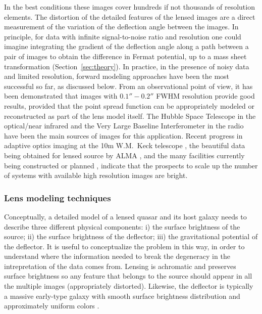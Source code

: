 In the best conditions these images cover hundreds if not thousands of
resolution elements. The distortion of the detailed features of the
lensed images are a direct measurement of the variation of the
deflection angle between the images.  In principle, for data with
infinite signal-to-noise ratio and resolution one could imagine
integrating the gradient of the deflection angle along a path between a
pair of images to obtain the difference in Fermat potential,
up to a mass sheet transformation (Section~\ref{sec:theory}).
In practice, in the presence of noisy data and limited resolution,
forward modeling approaches have been the most successful so far, as
discussed below. From an observational point of view, it has been
demonstrated that images with $0.1''-0.2''$ FWHM resolution provide
good results, provided that the point spread function can be
appropriately modeled or reconstructed as part of the lens model
itself. The Hubble Space Telescope in the optical/near infrared
\citep{Suy++10,Suy++13,Suy++14,BirrerEtal2015} and the Very Large Baseline
Interferometer in the radio \citep{WBB04} have been the main sources
of images for this application. Recent progress in adaptive optics
imaging at the 10m W.M.~Keck telescope \citep{Che++16}, the beautiful data being
obtained for lensed source by ALMA \citep{Hez++13a}, and the many
facilities currently being constructed or planned \citep{Men++15},
indicate that the prospects to scale up the number of systems with
available high resolution images are bright.


\subsubsection{Lens modeling techniques}

Conceptually, a detailed model of a lensed quasar and its host galaxy
needs to describe three different physical components: i) the surface
brightness of the source; ii) the surface brightness of the deflector;
iii) the gravitational potential of the deflector. It is useful to
conceptualize the problem in this way, in order to understand where
the information needed to break the degeneracy in the intrepretation
of the data comes from. Lensing is achromatic and preserves surface
brightness so any feature that belongs to the source \cite[including
in line of sight velocity][]{Hez++13} should appear in all the
multiple images (appropriately distorted). Likewise, the deflector is
typically a massive early-type galaxy with smooth surface brightness
distribution and approximately uniform colors \cite[except for dust,
see, e.g.][]{Suy++10}.

